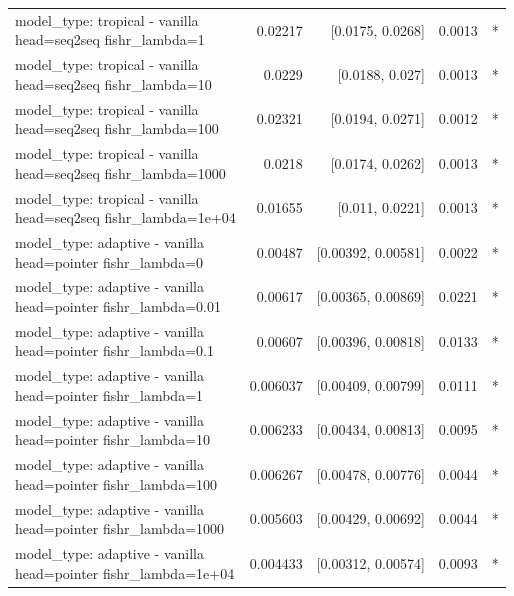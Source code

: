 \documentclass[10pt]{article}
\makeatletter
\newcommand{\stackcell}[1]{\begin{tabular}[t]{@{}l@{}}#1\end{tabular}}
\makeatother
\begin{document}
{\begin{longtable}{lrrrl}
\stackcell{model\_type: tropical - vanilla\\\footnotesize head=seq2seq fishr\_lambda=1 } & 0.02217 & [0.0175, 0.0268] & 0.0013 & *\\
\stackcell{model\_type: tropical - vanilla\\\footnotesize head=seq2seq fishr\_lambda=10 } & 0.0229 & [0.0188, 0.027] & 0.0013 & *\\
\stackcell{model\_type: tropical - vanilla\\\footnotesize head=seq2seq fishr\_lambda=100 } & 0.02321 & [0.0194, 0.0271] & 0.0012 & *\\
\stackcell{model\_type: tropical - vanilla\\\footnotesize head=seq2seq fishr\_lambda=1000 } & 0.0218 & [0.0174, 0.0262] & 0.0013 & *\\
\stackcell{model\_type: tropical - vanilla\\\footnotesize head=seq2seq fishr\_lambda=1e+04 } & 0.01655 & [0.011, 0.0221] & 0.0013 & *\\
\stackcell{model\_type: adaptive - vanilla\\\footnotesize head=pointer fishr\_lambda=0 } & 0.00487 & [0.00392, 0.00581] & 0.0022 & *\\
\stackcell{model\_type: adaptive - vanilla\\\footnotesize head=pointer fishr\_lambda=0.01 } & 0.00617 & [0.00365, 0.00869] & 0.0221 & *\\
\stackcell{model\_type: adaptive - vanilla\\\footnotesize head=pointer fishr\_lambda=0.1 } & 0.00607 & [0.00396, 0.00818] & 0.0133 & *\\
\stackcell{model\_type: adaptive - vanilla\\\footnotesize head=pointer fishr\_lambda=1 } & 0.006037 & [0.00409, 0.00799] & 0.0111 & *\\
\stackcell{model\_type: adaptive - vanilla\\\footnotesize head=pointer fishr\_lambda=10 } & 0.006233 & [0.00434, 0.00813] & 0.0095 & *\\
\stackcell{model\_type: adaptive - vanilla\\\footnotesize head=pointer fishr\_lambda=100 } & 0.006267 & [0.00478, 0.00776] & 0.0044 & *\\
\stackcell{model\_type: adaptive - vanilla\\\footnotesize head=pointer fishr\_lambda=1000 } & 0.005603 & [0.00429, 0.00692] & 0.0044 & *\\
\stackcell{model\_type: adaptive - vanilla\\\footnotesize head=pointer fishr\_lambda=1e+04 } & 0.004433 & [0.00312, 0.00574] & 0.0093 & *\\

\end{longtable}}
\end{document}
